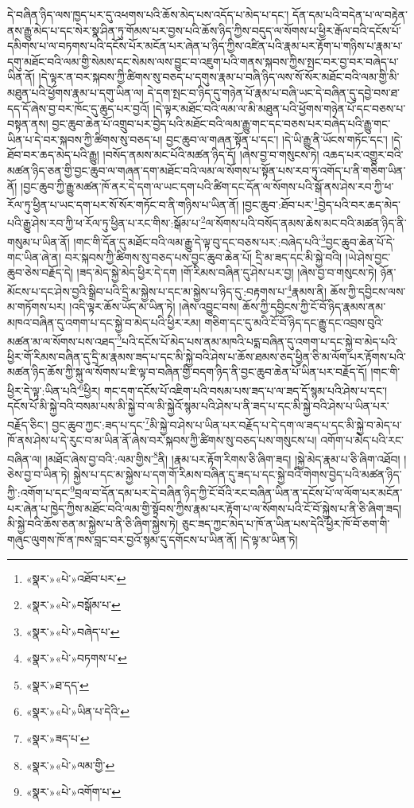 དེ་བཞིན་ཉིད་ལས་ཁྱད་པར་དུ་འཕགས་པའི་ཆོས་མེད་པས་འདོད་པ་མེད་པ་དང་། དོན་དམ་པའི་བདེན་པ་ལ་བརྟེན་ནས་རྒྱུ་མེད་པ་དང་སེར་སྣ་ཤིན་ཏུ་གོམས་པར་བྱས་པའི་ཆོས་ཉིད་ཀྱིས་བདུད་ལ་སོགས་པ་ཕྱིར་རྒོལ་བའི་དངོས་པོ་དམིགས་པ་ལ་བཏགས་པའི་དངོས་པོར་མངོན་པར་ཞེན་པ་ཉིད་ཀྱིས་འཛིན་པའི་རྣམ་པར་རྟོག་པ་གཉིས་པ་རྣམ་པ་དགུ་མཐོང་བའི་ལམ་གྱི་སེམས་དང་སེམས་ལས་བྱུང་བ་འཇུག་པའི་གནས་སྐབས་ཀྱིས་སྤང་བར་བྱ་བར་བཞེད་པ་ཡིན་ནོ། །དེ་ལྟར་ན་བར་སྐབས་ཀྱི་ཚིགས་སུ་བཅད་པ་དགུས་རྣམ་པ་བཞི་ཉིད་ལས་སོ་སོར་མཐོང་བའི་ལམ་གྱི་མི་མཐུན་པའི་ཕྱོགས་རྣམ་པ་དགུ་ཡིན་ལ། དེ་དག་སྤང་བ་ཉིད་དུ་གཉེན་པོ་རྣམ་པ་བཞི་ཡང་དེ་བཞིན་དུ་དབྱེ་བས་ཐ་དད་དོ་ཞེས་བྱ་བར་ཁོང་དུ་ཆུད་པར་བྱའོ། །དེ་ལྟར་མཐོང་བའི་ལམ་ལ་མི་མཐུན་པའི་ཕྱོགས་གཉེན་པོ་དང་བཅས་པ་བསྟན་ནས། བྱང་ཆུབ་ཆེན་པོ་འགྲུབ་པར་བྱེད་པའི་མཐོང་བའི་ལམ་རྒྱུ་གང་དང་བཅས་པར་བཞེད་པའི་རྒྱུ་གང་ཡིན་པ་དེ་བར་སྐབས་ཀྱི་ཚིགས་སུ་བཅད་པ། བྱང་ཆུབ་ལ་གཞན་སྟོན་པ་དང་། །དེ་ཡི་རྒྱུ་ནི་ཡོངས་གཏོང་དང་། །དེ་ཐོབ་བར་ཆད་མེད་པའི་རྒྱུ། །བསོད་ནམས་མང་པོའི་མཚན་ཉིད་དོ། །ཞེས་བྱ་བ་གསུངས་ཏེ། འཆད་པར་འགྱུར་བའི་མཚན་ཉིད་ཅན་གྱི་བྱང་ཆུབ་ལ་གཞན་དག་མཐོང་བའི་ལམ་ལ་སོགས་པ་སྟོན་པས་རབ་ཏུ་འགོད་པ་ནི་གཅིག་ཡིན་ནོ། །བྱང་ཆུབ་ཀྱི་རྒྱུ་མཚན་ཁོ་ནར་དེ་དག་ལ་ཡང་དག་པའི་ཚིག་དང་དོན་ལ་སོགས་པའི་སྒོ་ནས་ཤེས་རབ་ཀྱི་ཕ་རོལ་ཏུ་ཕྱིན་པ་ཡང་དག་པར་སོ་སོར་གཏོང་བ་ནི་གཉིས་པ་ཡིན་ནོ། །བྱང་ཆུབ་:ཐོབ་པར་\footnote{«སྣར་»«པེ་»འཐོབ་པར་}བྱེད་པའི་བར་ཆད་མེད་པའི་རྒྱུ་ཤེས་རབ་ཀྱི་ཕ་རོལ་ཏུ་ཕྱིན་པ་རང་གིས་:སྒོམ་པ་\footnote{«སྣར་»«པེ་»བསྒོམ་པ་}ལ་སོགས་པའི་བསོད་ནམས་ཆེས་མང་བའི་མཚན་ཉིད་ནི་གསུམ་པ་ཡིན་ནོ། །གང་གི་དོན་དུ་མཐོང་བའི་ལམ་རྒྱུ་དེ་ལྟ་བུ་དང་བཅས་པར་:བཞེད་པའི་\footnote{«སྣར་»«པེ་»བཞེད་པ་}བྱང་ཆུབ་ཆེན་པོ་དེ་གང་ཡིན་ཞེ་ན། བར་སྐབས་ཀྱི་ཚིགས་སུ་བཅད་པས་བྱང་ཆུབ་ཆེན་པོ། དྲི་མ་ཟད་དང་མི་སྐྱེ་བའི། །ཡེ་ཤེས་བྱང་ཆུབ་ཅེས་བརྗོད་དེ། །ཟད་མེད་སྐྱེ་མེད་ཕྱིར་དེ་དག །གོ་རིམས་བཞིན་དུ་ཤེས་པར་བྱ། །ཞེས་བྱ་བ་གསུངས་ཏེ། ཉོན་མོངས་པ་དང་ཤེས་བྱའི་སྒྲིབ་པའི་དྲི་མ་སྐྱེས་པ་དང་མ་སྐྱེས་པ་ཉིད་དུ་:བརྟགས་པ་\footnote{«སྣར་»«པེ་»བཏགས་པ་}རྣམས་ནི། ཆོས་ཀྱི་དབྱིངས་ལས་མ་གཏོགས་པར། །འདི་ལྟར་ཆོས་ཡོད་མ་ཡིན་ཏེ། །ཞེས་འབྱུང་བས། ཆོས་ཀྱི་དབྱིངས་ཀྱི་ངོ་བོ་ཉིད་རྣམས་ནམ་མཁའ་བཞིན་དུ་འགག་པ་དང་སྐྱེ་བ་མེད་པའི་ཕྱིར་རམ། གཅིག་དང་དུ་མའི་ངོ་བོ་ཉིད་དང་རྒྱུ་དང་འབྲས་བུའི་མཚན་མ་ལ་སོགས་པས་འཐད་\footnote{«སྣར་»ཐ་དད་}པའི་དངོས་པོ་མེད་པས་ནམ་མཁའི་པདྨ་བཞིན་དུ་འགག་པ་དང་སྐྱེ་བ་མེད་པའི་ཕྱིར་གོ་རིམས་བཞིན་དུ་དྲི་མ་རྣམས་ཟད་པ་དང་མི་སྐྱེ་བའི་ཤེས་པ་ཆོས་ཐམས་ཅད་ཕྱིན་ཅི་མ་ལོག་པར་རྟོགས་པའི་མཚན་ཉིད་ཆོས་ཀྱི་སྐུ་ལ་སོགས་པ་ཇི་ལྟ་བ་བཞིན་གྱི་བདག་ཉིད་ནི་བྱང་ཆུབ་ཆེན་པོ་ཡིན་པར་བརྗོད་དོ། །གང་གི་ཕྱིར་དེ་ལྟ་:ཡིན་པའི་\footnote{«སྣར་»«པེ་»ཡིན་པ་དེའི་}ཕྱིར། གང་དག་དངོས་པོ་འཇིག་པའི་བསམ་པས་ཟད་པ་ལ་ཟད་དོ་སྙམ་པའི་ཤེས་པ་དང་། དངོས་པོ་མི་སྐྱེ་བའི་བསམ་པས་མི་སྐྱེ་བ་ལ་མི་སྐྱེའོ་སྙམ་པའི་ཤེས་པ་ནི་ཟད་པ་དང་མི་སྐྱེ་བའི་ཤེས་པ་ཡིན་པར་བརྗོད་ཅིང་། བྱང་ཆུབ་ཀྱང་:ཟད་པ་དང་\footnote{«སྣར་»ཟད་པ་}མི་སྐྱེ་བ་ཤེས་པ་ཡིན་པར་བརྗོད་པ་དེ་དག་ལ་ཟད་པ་དང་མི་སྐྱེ་བ་མེད་པ་ཁོ་ནས་ཤེས་པ་དེ་རུང་བ་མ་ཡིན་ནོ་ཞེས་བར་སྐབས་ཀྱི་ཚིགས་སུ་བཅད་པས་གསུངས་པ། འགོག་པ་མེད་པའི་རང་བཞིན་ལ། །མཐོང་ཞེས་བྱ་བའི་:ལམ་གྱིས་\footnote{«སྣར་»«པེ་»ལམ་གྱི་}ནི། །རྣམ་པར་རྟོག་རིགས་ཅི་ཞིག་ཟད། །སྐྱེ་མེད་རྣམ་པ་ཅི་ཞིག་འཐོབ། །ཅེས་བྱ་བ་ཡིན་ཏེ། སྐྱེས་པ་དང་མ་སྐྱེས་པ་དག་གོ་རིམས་བཞིན་དུ་ཟད་པ་དང་སྐྱེ་བའི་གེགས་བྱེད་པའི་མཚན་ཉིད་ཀྱི་:འགོག་པ་དང་\footnote{«སྣར་»«པེ་»འགོག་པ་}བྲལ་བ་དོན་དམ་པར་དེ་བཞིན་ཉིད་ཀྱི་ངོ་བོའི་རང་བཞིན་ཡིན་ན་དངོས་པོ་ལ་ལོག་པར་མངོན་པར་ཞེན་པ་ཁྱེད་ཀྱིས་མཐོང་བའི་ལམ་གྱི་སྟོབས་ཀྱིས་རྣམ་པར་རྟོག་པ་ལ་སོགས་པའི་ངོ་བོ་སྐྱེས་པ་ནི་ཅི་ཞིག་ཟད། མི་སྐྱེ་བའི་ཆོས་ཅན་མ་སྐྱེས་པ་ནི་ཅི་ཞིག་སྐྱེས་ཏེ། ཅུང་ཟད་ཀྱང་མེད་པ་ཁོ་ན་ཡིན་པས་དེའི་ཕྱིར་ཁོ་བོ་ཅག་གི་གཞུང་ལུགས་ཁོ་ན་ཁས་བླང་བར་བྱའོ་སྙམ་དུ་དགོངས་པ་ཡིན་ནོ། །དེ་ལྟ་མ་ཡིན་ཏེ། 